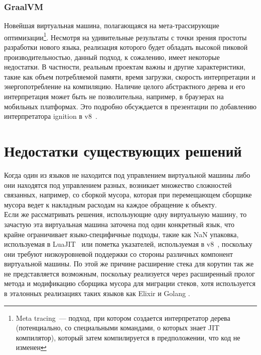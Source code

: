 \documentclass[times,specification,annotation]{itmo-student-thesis}
\begin{document}
\subsubsection{GraalVM}
Новейшая виртуальная машина, полагающаяся на мета-трассирующие оптимизации\footnote{Meta tracing~--- подход, при котором создается интерпретатор дерева (потенциально, со специальными командами, о которых знает JIT компилятор), который затем компилируется в предположении, что код не изменен}. Несмотря на удивительные результаты с точки зрения простоты разработки нового языка, реализация которого будет обладать высокой пиковой производительностью, данный подход, к сожалению, имеет некоторые недостатки. В частности, реальным проектам важны и другие характеристики, такие как объем потребляемой памяти, время загрузки, скорость интерпретации и энергопотребление на компиляцию. Наличие целого абстрактного дерева и его интерпретация может быть не позволительна, например, в браузерах на мобильных платформах. Это подробно обсуждается в презентации по добавлению интерпретатора ignition в v8~\cite{ignition-iterpreter}.

\section{Недостатки существующих решений}
Когда один из языков не находится под управлением виртуальной машины либо они находятся под управлением разных, возникает множество сложностей связанных, например, со сборкой мусора, которая при перемещающем сборщике мусора ведет к накладным расходам на каждое обращение к объекту.\\
Если же рассматривать решения, использующие одну виртуальную машину, то зачастую эта виртуальная машина заточена под один конкретный язык, что крайне ограничивает языко-специфичные подходы, такие как NaN упаковка, используемая в LuaJIT~\cite{luajit-nan-box} или пометка указателей, используемая в v8~\cite{v8-pointer-tagging}, поскольку они требуют низкоуровневой поддержки со стороны различных компонент виртуальной машины. По этой же причине расширение стека для корутин так же не представляется возможным, поскольку реализуется через расширенный пролог метода и модификацию сборщика мусора для миграции стеков, хотя используется в эталонных реализациях таких языков как Elixir и Golang \cite{golang-stack}.

\finishrelatedwork
\end{document}
